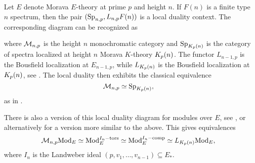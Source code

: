 \begin{example}
    \label{ch1:ex:local-duality-chromatic}
    Let $E$ denote Morava $E$-theory at prime $p$ and height $n$. If $F(n)$ is a finite type $n$ spectrum, then the pair $(\mathrm{Sp}_{n,p}, L_{n,p} F(n))$ is a local duality context. The corresponding diagram can be recognized as
    \begin{center}
    \end{center}
    where $\mathcal{M}_{n,p}$ is the height $n$ monochromatic category and $\mathrm{Sp}_{{K_p(n)}}$ is the category of spectra localized at height $n$ Morava $K$-theory ${K_p(n)}$. The functor $L_{n-1,p}$ is the Bousfield localization at $E_{n-1,p}$, while $L_{{K_p(n)}}$ is the Bousfield localization at ${K_p(n)}$, see \cite{bousfield_1979_localization}. The local duality then exhibits the classical equivalence 
    \[\mathcal{M}_{n,p}\simeq \mathrm{Sp}_{{K_p(n)}},\] 
    as in \cite[6.19]{hovey-strickland_99}. 
\end{example}

\begin{remark}
    \label{ch1:rm:local-duality-modules}
    There is also a version of this local duality diagram for modules over $E$, see \cite[4.2, 5.1]{greenlees-may_1995}, or alternatively \cite[3.7]{barthel-heard-valenzuela_2018} for a version more similar to the above. This gives equivalences 
    \[\mathcal{M}_{n,p}\mathrm{Mod}_{E}\simeq \mathrm{Mod}_{E}^{I_n-\mathrm{tors}}\simeq \mathrm{Mod}_{E}^{I_n-\mathrm{comp}}\simeq L_{{K_p(n)}}\mathrm{Mod}_{E},\]
    where $I_n$ is the Landweber ideal $(p,v_1, \ldots, v_{n-1})\subseteq E_*$.
\end{remark}

